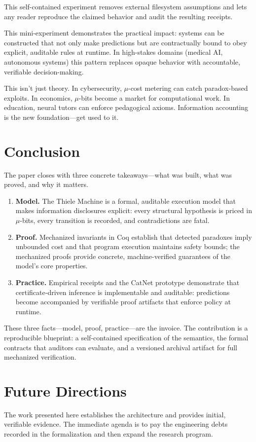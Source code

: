 \documentclass[11pt]{article}
\begin{document}
This self-contained experiment removes external filesystem assumptions and lets any reader reproduce the claimed behavior and audit the resulting receipts.

This mini-experiment demonstrates the practical impact: systems can be constructed that not only make predictions but are contractually bound to obey explicit, auditable rules at runtime. In high-stakes domains (medical AI, autonomous systems) this pattern replaces opaque behavior with accountable, verifiable decision-making.

This isn’t just theory. In cybersecurity, $\mu$-cost metering can catch paradox-based exploits. In economics, $\mu$-bits become a market for computational work. In education, neural tutors can enforce pedagogical axioms. Information accounting is the new foundation---get used to it.

\section{Conclusion}
The paper closes with three concrete takeaways—what was built, what was proved, and why it matters.

\begin{enumerate}
  \item \textbf{Model.} The Thiele Machine is a formal, auditable execution model that makes information disclosures explicit: every structural hypothesis is priced in \(\mu\)-bits, every transition is recorded, and contradictions are fatal.
  \item \textbf{Proof.} Mechanized invariants in Coq establish that detected paradoxes imply unbounded cost and that program execution maintains safety bounds; the mechanized proofs provide concrete, machine-verified guarantees of the model's core properties.
  \item \textbf{Practice.} Empirical receipts and the CatNet prototype demonstrate that certificate‑driven inference is implementable and auditable: predictions become accompanied by verifiable proof artifacts that enforce policy at runtime.
\end{enumerate}

These three facts—model, proof, practice—are the invoice. The contribution is a reproducible blueprint: a self-contained specification of the semantics, the formal contracts that auditors can evaluate, and a versioned archival artifact for full mechanized verification.

\section{Future Directions}
The work presented here establishes the architecture and provides initial, verifiable evidence. The immediate agenda is to pay the engineering debts recorded in the formalization and then expand the research program.
\end{document}
